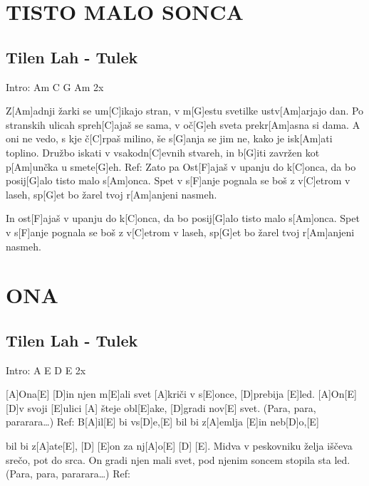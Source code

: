 \documentclass{article}
\begin{document}
\section*{TISTO MALO SONCA}
%
\subsection*{Tilen Lah - Tulek}
\begin{guitar}
Intro: Am C G Am 2x

Z[Am]adnji žarki se um[C]ikajo stran,
v m[G]estu svetilke ustv[Am]arjajo dan.
Po stranskih ulicah spreh[C]ajaš se sama,
v oč[G]eh sveta prekr[Am]asna si dama.
A oni ne vedo, s kje č[C]rpaš milino,
še s[G]anja se jim ne, kako je isk[Am]ati toplino.
Družbo iskati v vsakodn[C]evnih stvareh,
in b[G]iti zavržen kot p[Am]unčka u smete[G]eh.
\linebreak
Ref:
Zato pa
Ost[F]ajaš v upanju do k[C]onca,
da bo posij[G]alo tisto malo s[Am]onca.
Spet v s[F]anje pognala se boš z v[C]etrom v laseh,
sp[G]et bo žarel tvoj r[Am]anjeni nasmeh.

In ost[F]ajaš v upanju do k[C]onca,
da bo posij[G]alo tisto malo s[Am]onca.
Spet v s[F]anje pognala se boš z v[C]etrom v laseh,
sp[G]et bo žarel tvoj r[Am]anjeni nasmeh.
\end{guitar}
\pagebreak

\section*{ONA}
%
\subsection*{Tilen Lah - Tulek}
\begin{guitar}
Intro: A E D E 2x

[A]Ona[E] [D]in njen m[E]ali svet
[A]kriči v s[E]once, [D]prebija [E]led.
[A]On[E] [D]v svoji [E]ulici
[A] šteje obl[E]ake, [D]gradi nov[E] svet.
(Para, para, pararara…)
\linebreak
Ref:
B[A]il[E] bi vs[D]e,[E] bil bi z[A]emlja [E]in neb[D]o,[E]

bil bi z[A]ate[E], [D] [E]on za nj[A]o[E] [D] [E].
\linebreak
Midva v peskovniku želja
iščeva srečo, pot do srca.
On gradi njen mali svet,
pod njenim soncem stopila sta led.
(Para, para, pararara…)
\linebreak
Ref:
\end{guitar}
\end{document}
